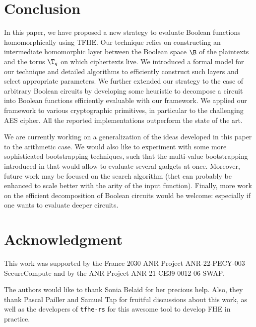 \section{Conclusion}

In this paper, we have proposed a new strategy to evaluate Boolean functions homomorphically using TFHE. Our technique relies on constructing an intermediate homomorphic layer between the Boolean space $\B$ of the plaintexts and the torus $\T_q$ on which ciphertexts live. We introduced a formal model for our technique and detailed algorithms to efficiently construct such layers and select appropriate parameters. We further extended our strategy to the case of arbitrary Boolean circuits by developing some heuristic to decompose a circuit into Boolean functions efficiently evaluable with our framework. We applied our framework to various cryptographic primitives, in particular to the challenging AES cipher. All the reported implementations outperform the state of the art. 

We are currently working on a generalization of the ideas developed in this paper to the arithmetic case. We would also like to experiment with some more sophisticated bootstrapping techniques, such that the multi-value bootstrapping introduced in \cite{MVB} that would allow to evaluate several gadgets at once. Moreover, future work may be focused on the search algorithm (thet can probably be enhanced to scale better with the arity of the input function). Finally, more work on the efficient decomposition of Boolean circuits would be welcome: especially if one wants to evaluate deeper circuits.


\section{Acknowledgment}

This work was supported by the France 2030 ANR Project ANR-22-PECY-003 SecureCompute and by the ANR Project ANR-21-CE39-0012-06 SWAP.

The authors would like to thank Sonia Belaïd for her precious help. Also, they thank Pascal Pailler and Samuel Tap for fruitful discussions about this work, as well as the developers of \texttt{tfhe-rs} for this awesome tool to develop FHE in practice.

